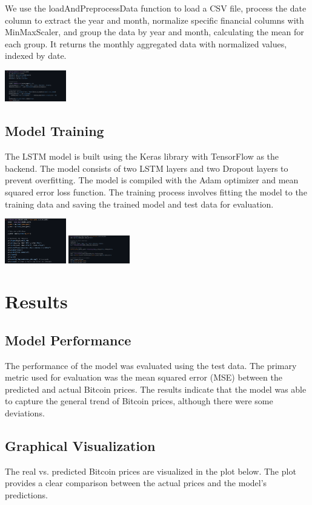 \documentclass{article}
\begin{document}
We use the loadAndPreprocessData function to load a CSV file, process the date column to extract the year and month, normalize specific financial columns with MinMaxScaler, and group the data by year and month, calculating the mean for each group. It returns the monthly aggregated data with normalized values, indexed by date.

\includegraphics[width=0.2\textwidth]{img/Capture d’écran 2025-01-05 200052.png}
\subsection{Model Training}
The LSTM model is built using the Keras library with TensorFlow as the backend. The model consists of two LSTM layers and two Dropout layers to prevent overfitting. The model is compiled with the Adam optimizer and mean squared error loss function. The training process involves fitting the model to the training data and saving the trained model and test data for evaluation.

\includegraphics[width=0.2\textwidth]{img/evaluation.png}
\includegraphics[width=0.2\textwidth]{img/Capture d’écran 2025-01-05 201711.png}

\section{Results}
\subsection{Model Performance}
The performance of the model was evaluated using the test data. The primary metric used for evaluation was the mean squared error (MSE) between the predicted and actual Bitcoin prices. The results indicate that the model was able to capture the general trend of Bitcoin prices, although there were some deviations.

\subsection{Graphical Visualization}
The real vs. predicted Bitcoin prices are visualized in the plot below. The plot provides a clear comparison between the actual prices and the model's predictions.
\end{document}
